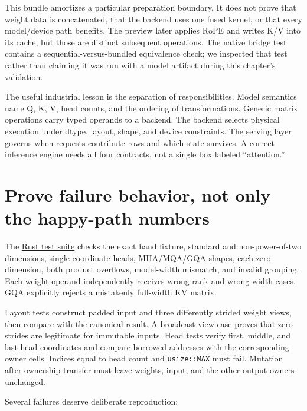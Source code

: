 This bundle amortizes a particular preparation boundary. It does not
prove that weight data is concatenated, that the backend uses one fused
kernel, or that every model/device path benefits. The preview later
applies RoPE and writes K/V into its cache, but those are distinct
subsequent operations. The native bridge test contains a
sequential-versus-bundled equivalence check; we inspected that test
rather than claiming it was run with a model artifact during this
chapter's validation.

The useful industrial lesson is the separation of responsibilities.
Model semantics name Q, K, V, head counts, and the ordering of
transformations. Generic matrix operations carry typed operands to a
backend. The backend selects physical execution under dtype, layout,
shape, and device constraints. The serving layer governs when requests
contribute rows and which state survives. A correct inference engine
needs all four contracts, not a single box labeled ``attention.''

\section{Prove failure behavior, not only the happy-path
numbers}\label{prove-failure-behavior-not-only-the-happy-path-numbers}

The
\href{https://github.com/hermonai/inside-the-llm-engine/blob/astra-visual-rewrite/code/mini-engine/crates/engine0/tests/qkv.rs}{Rust
test suite} checks the exact hand fixture, standard and non-power-of-two
dimensions, single-coordinate heads, MHA/MQA/GQA shapes, each zero
dimension, both product overflows, model-width mismatch, and invalid
grouping. Each weight operand independently receives wrong-rank and
wrong-width cases. GQA explicitly rejects a mistakenly full-width KV
matrix.

Layout tests construct padded input and three differently strided weight
views, then compare with the canonical result. A broadcast-view case
proves that zero strides are legitimate for immutable inputs. Head tests
verify first, middle, and last head coordinates and compare borrowed
addresses with the corresponding owner cells. Indices equal to head
count and \texttt{usize::MAX} must fail. Mutation after ownership
transfer must leave weights, input, and the other output owners
unchanged.

Several failures deserve deliberate reproduction:

